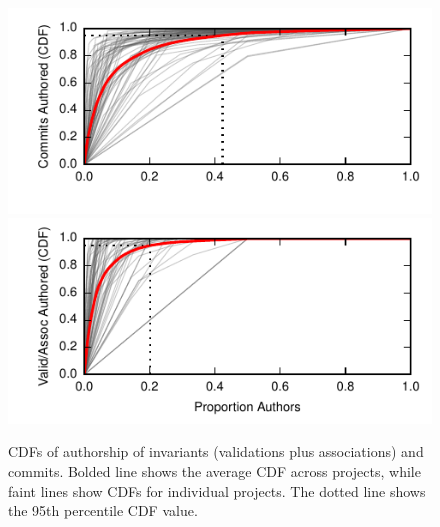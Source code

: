 \begin{figure}[h!]
  \newcommand{\skipht}{\\[-2em]}
\includegraphics[width=\columnwidth]{figs/commit-authorship-cdf.pdf}\vspace{-2em}
\includegraphics[width=\columnwidth]{figs/invariant-authorship-cdf.pdf}\vspace{-1em}
\caption{CDFs of authorship of invariants (validations plus
  associations) and commits. Bolded line
  shows the average CDF across projects, while faint lines show CDFs
  for individual projects. The dotted line shows the 95th percentile
  CDF value. }\vspace{0em}
\label{fig:cdfs}
\end{figure}




\appendix

